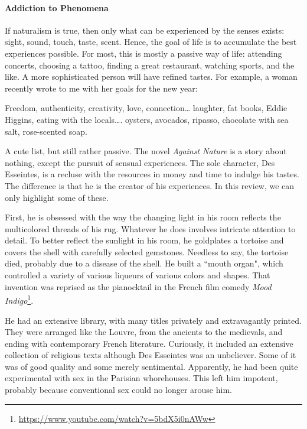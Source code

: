 \paragraph{Addiction to Phenomena}
If naturalism is true, then only what can be experienced by the senses exists: sight, sound, touch, taste, scent. Hence, the goal of life is to accumulate the best experiences possible. For most, this is mostly a passive way of life: attending concerts, choosing a tattoo, finding a great restaurant, watching sports, and the like. A more sophisticated person will have refined tastes. For example, a woman recently wrote to me with her goals for the new year:

\begin{quotex}
Freedom, authenticity, creativity, love, connection… laughter, fat books, Eddie Higgins, eating with the locals…. oysters, avocados, ripasso, chocolate with sea salt, rose-scented soap. 

\end{quotex}
A cute list, but still rather passive. The novel \emph{Against Nature} is a story about nothing, except the pursuit of sensual experiences. The sole character, Des Esseintes, is a recluse with the resources in money and time to indulge his tastes. The difference is that he is the creator of his experiences. In this review, we can only highlight some of these.

First, he is obsessed with the way the changing light in his room reflects the multicolored threads of his rug. Whatever he does involves intricate attention to detail. To better reflect the sunlight in his room, he goldplates a tortoise and covers the shell with carefully selected gemstones. Needless to say, the tortoise died, probably due to a disease of the shell. He built a ``mouth organ", which controlled a variety of various liqueurs of various colors and shapes. That invention was reprised as the pianocktail in the French film comedy \textit{Mood Indigo}\footnote{\url{https://www.youtube.com/watch?v=5bdX5i0nAWw}}.

He had an extensive library, with many titles privately and extravagantly printed. They were arranged like the Louvre, from the ancients to the medievals, and ending with contemporary French literature. Curiously, it included an extensive collection of religious texts although Des Esseintes was an unbeliever. Some of it was of good quality and some merely sentimental. Apparently, he had been quite experimental with sex in the Parisian whorehouses. This left him impotent, probably because conventional sex could no longer arouse him.

